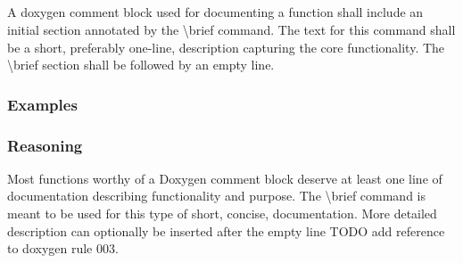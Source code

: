 \subsection*{\doxygenRule{}}

A doxygen comment block used for documenting a function shall include an initial section annotated by the \textbackslash brief command. The text for this command shall be a short, preferably one-line, description capturing the core functionality. The \textbackslash brief section shall be followed by an empty line.

\subsubsection*{Examples}

\noindent
\begin{minipage}[t]{\codelstwidth\textwidth}
    
\end{minipage}\hfill
\begin{minipage}[t]{\codelstwidth\textwidth}
    
\end{minipage}

\subsubsection*{Reasoning}

 Most functions worthy of a Doxygen comment block deserve at least one line of documentation describing functionality and purpose. The \textbackslash brief command is meant to be used for this type of short, concise, documentation. More detailed description can optionally be inserted after the empty line TODO add reference to doxygen rule 003.
